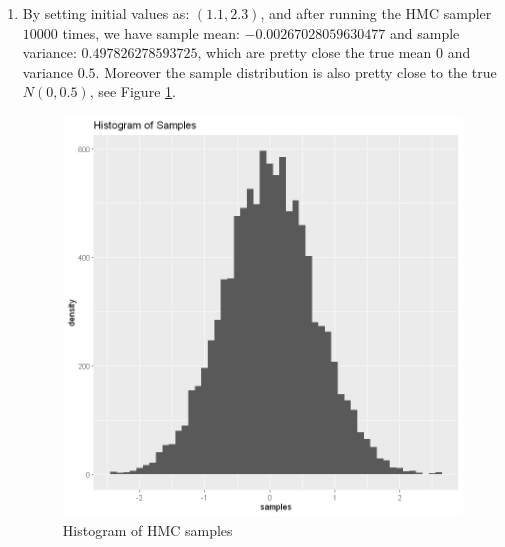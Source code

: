 \documentclass{article}
\begin{document}
\begin{enumerate}
\item 
By setting initial values as: $(1.1, 2.3)$, and after running the HMC sampler $10000$ times, we have sample mean: $-0.00267028059630477$ and sample variance: $0.497826278593725$, which are pretty close the true mean $0$ and variance $0.5$. Moreover the sample distribution is also pretty close to the true $N(0, 0.5)$, see Figure \ref{fig:hist}.
\begin{figure}[H]
\centering
\includegraphics[width = \textwidth, height= 0.5\textheight]{hist.png}
\caption{Histogram of HMC samples}
\label{fig:hist}
\end{figure}
\end{enumerate}

 
\end{document}
